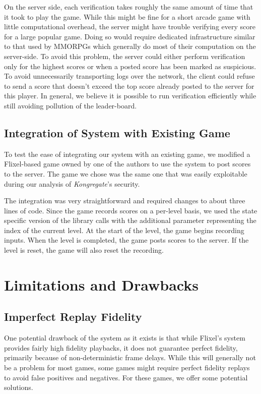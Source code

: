 \documentclass [11pt, twocolumn] {article}
\begin{document}
On the server side, each verification takes roughly the same amount of time that it took to play the game. While this might be fine for a short arcade game with little computational overhead, the server might have trouble verifying every score for a large popular game. Doing so would require dedicated infrastructure similar to that used by MMORPGs which generally do most of their computation on the server-side. To avoid this problem, the server could either perform verification only for the highest scores or when a posted score has been marked as suspicious. To avoid unnecessarily transporting logs over the network, the client could refuse to send a score that doesn't exceed the top score already posted to the server for this player. In general, we believe it is possible to run verification efficiently while still avoiding pollution of the leader-board. 

\subsection {Integration of System with Existing Game} 

To test the ease of integrating our system with an existing game, we modified a Flixel-based game owned by one of the authors to use the system to post scores to the server. The game we chose was the same one that was easily exploitable during our analysis of \emph{Kongregate}'s security.

The integration was very straightforward and required changes to about three lines of code. Since the game records scores on a per-level basis, we used the state specific version of the library calls with the additional parameter representing the index of the current level. At the start of the level, the game begins recording inputs. When the level is completed, the game posts scores to the server. If the level is reset, the game will also reset the recording. 

\section { Limitations and Drawbacks }
\label{sec:limitations}

\subsection { Imperfect Replay Fidelity }

One potential drawback of the system as it exists is that while Flixel's system provides fairly high fidelity playbacks, it does not guarantee perfect fidelity, primarily because of non-deterministic frame delays. While this will generally not be a problem for most games, some games might require perfect fidelity replays to avoid false positives and negatives. For these games, we offer some potential solutions. 
\end{document}
